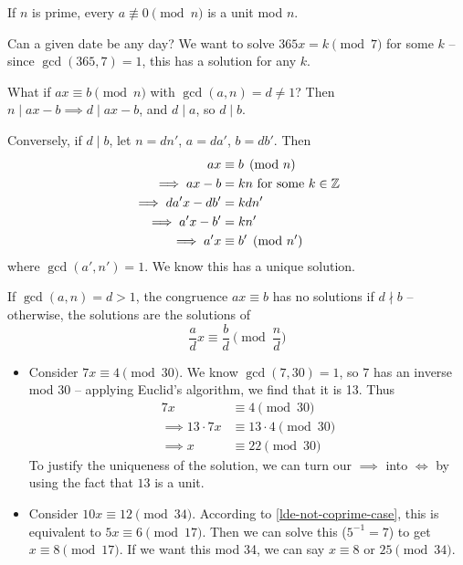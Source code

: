 \documentclass{../template/note}
\begin{document}
    \begin{corollary}
        If \(n\) is prime, every \(a \not\equiv 0 \pmod n\) is a unit mod \(n\).
    \end{corollary}

    \begin{example}
        Can a given date be any day? We want to solve \(365x = k \pmod 7\) for some \(k\) -- since \(\gcd(365, 7) = 1\), this has a solution for any \(k\).
    \end{example}
    What if \(ax \equiv b \pmod n\) with \(\gcd(a, n) = d \neq 1\)? Then \(n \mid ax - b \implies d \mid ax - b\), and \(d \mid a\), so \(d \mid b\).

    Conversely, if \(d \mid b\), let \(n = dn'\), \(a = da'\), \(b = db'\). Then
    \begin{align*}
        ax &\equiv b \pmod n \\
        \implies ax - b &= kn \text{ for some } k \in \mathbb Z \\
        \implies da'x - db' &= kdn' \\
        \implies a'x - b' &= kn' \\
        \implies a'x &\equiv b' \pmod{n'}
    \end{align*}
    where \(\gcd(a', n') = 1\). We know this has a unique solution.

    \begin{proposition}
        If \(\gcd(a, n) = d > 1\), the congruence \(ax \equiv b\) has no solutions if \(d \nmid b\) -- otherwise, the solutions are the solutions of
        \[
            \frac{a}{d}x \equiv \frac{b}{d} \pmod{\frac{n}{d}}
        \]
        \label{lde-not-coprime-case}
    \end{proposition}
    
    \begin{example}
        \begin{itemize}
            \item Consider \(7x \equiv 4 \pmod {30}\). We know \(\gcd(7, 30) = 1\), so \(7\) has an inverse mod \(30\) -- applying Euclid's algorithm, we find that it is 13. Thus
            \begin{align*}
                7x &\equiv 4 \pmod {30} \\
                \implies 13 \cdot 7x &\equiv 13 \cdot 4 \pmod {30} \\
                \implies x &\equiv 22 \pmod {30}
            \end{align*}
            To justify the uniqueness of the solution, we can turn our \(\implies\) into \(\iff\) by using the fact that \(13\) is a unit.
            \item Consider \(10x \equiv 12 \pmod {34}\). According to \cref{lde-not-coprime-case}, this is equivalent to \(5x \equiv 6 \pmod {17}\). Then we can solve this (\(5^{-1} = 7\)) to get \(x \equiv 8 \pmod {17}\). If we want this mod 34, we can say \(x \equiv 8\) or \(25 \pmod {34}\).
        \end{itemize}
    \end{example}
    
\end{document}
